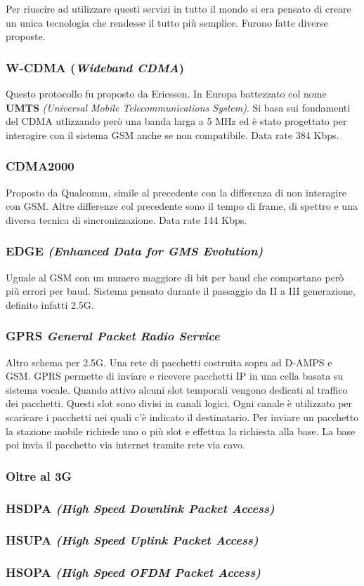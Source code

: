 Per riuscire ad utilizzare questi servizi in tutto il mondo si era pensato di creare un unica tecnologia che rendesse il tutto più semplice. Furono fatte diverse proposte.

\subsubsection*{W-CDMA (\textit{Wideband CDMA})}

Questo protocollo fu proposto da Ericsson. In Europa battezzato col nome \textbf{UMTS} \textit{(Universal Mobile Telecommunications System)}. Si basa sui fondamenti del CDMA utlizzando però una banda larga a 5 MHz ed è stato progettato per interagire con il sistema GSM anche se non compatibile. Data rate 384 Kbps.

\subsubsection*{CDMA2000}

Proposto da Qualcomm, simile al precedente con la differenza di non interagire con GSM. Altre differenze col precedente sono il tempo di frame, di spettro e una diversa tecnica di sincronizzazione. Data rate 144 Kbps.

\subsubsection*{EDGE \textit{(Enhanced Data for GMS Evolution)}}

Uguale al GSM con un numero maggiore di bit per baud che comportano però più errori per baud. Sistema pensato durante il passaggio da II a III generazione, definito infatti 2.5G.

\subsubsection*{GPRS \textit{General Packet Radio Service}}

Altro schema per 2.5G. Una rete di pacchetti costruita sopra ad D-AMPS e GSM. GPRS permette di inviare e ricevere pacchetti IP in una cella basata su sistema vocale. Quando attivo alcuni slot temporali vengono dedicati al traffico dei pacchetti. Questi slot sono divisi in canali logici. Ogni canale è utilizzato per scaricare i pacchetti nei quali c'è indicato il destinatario. Per inviare un pacchetto la stazione mobile richiede uno o più slot e effettua la richiesta alla base. La base poi invia il pacchetto via internet tramite rete via cavo.

\subsubsection{Oltre al 3G}

\subsubsection*{HSDPA \textit{(High Speed Downlink Packet Access)}}

\subsubsection*{HSUPA \textit{(High Speed Uplink Packet Access)}}

\subsubsection*{HSOPA \textit{(High Speed OFDM Packet Access)}}

\newpage